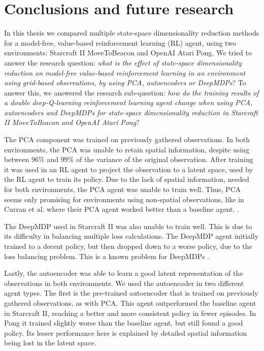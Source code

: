 \chapter{Conclusions and future research}\label{conclusions}
In this thesis we compared multiple state-space dimensionality reduction methods for a model-free, value-based reinforcement learning (RL) agent, using two environments: Starcraft II MoveToBeacon and OpenAI Atari Pong. We tried to answer the research question: \textit{what is the effect of state-space dimensionality reduction on model-free value-based reinforcement learning in an environment using grid-based observations, by using PCA, autoencoders or DeepMDPs}? To answer this, we answered the research sub-question: \textit{how do the training results of a double deep-Q-learning reinforcement learning agent change when using PCA, autoencoders and DeepMDPs for state-space dimensionality reduction in Starcraft II MoveToBeacon and OpenAI Atari Pong}? 

The PCA component was trained on previously gathered observations. In both environments, the PCA was unable to retain spatial information, despite using between $96\%$ and $99\%$ of the variance of the original observation. After training it was used in an RL agent to project the observation to a latent space, used by the RL agent to train its policy. Due to the lack of spatial information, needed for both environments, the PCA agent was unable to train well. Thus, PCA seems only promising for environments using non-spatial observations, like in Curran et al. where their PCA agent worked better than a baseline agent. \cite{mario}.

The DeepMDP used in Starcraft II was also unable to train well. This is due to its difficulty in balancing multiple loss calculations. The DeepMDP agent initially trained to a decent policy, but then dropped down to a worse policy, due to the loss balancing problem. This is a known problem for DeepMDPs \cite{deepmdp}.

Lastly, the autoencoder was able to learn a good latent representation of the observations in both environments. We used the autoencoder in two different agent types. The first is the pre-trained autoencoder that is trained on previously gathered observations, as with PCA. This agent outperformed the baseline agent in Starcraft II, reaching a better and more consistent policy in fewer episodes. In Pong it trained slightly worse than the baseline agent, but still found a good policy. Its lesser performance here is explained by detailed spatial information being lost in the latent space.

